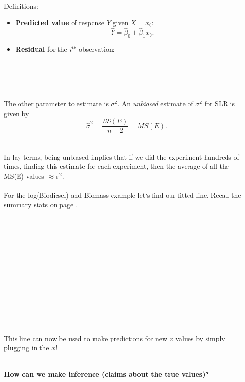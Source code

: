\newpage

Definitions:
\begin{itemize}
\item \textbf{Predicted value} of response $Y$ given $X=x_0$: 
$$ \hat{Y}=\hat\beta_0 + \hat\beta_1 x_0.$$
\item \textbf{Residual} for the $i^{th}$ observation: 
\\~\\~\\~\\~\\
\end{itemize}

The other parameter to estimate is $\sigma^2$.  An {\em unbiased} estimate of $\sigma^2$ for SLR is given by
$$\hat\sigma^2=\frac{SS(E)}{n-2}=MS(E).$$~\\~\\

In lay terms, being unbiased implies that if we did the experiment hundreds of times, finding this estimate for each experiment, then the average of all the MS(E) values $\approx\sigma^2$. \\~\\

For the log(Biodiesel) and Biomass example let`s find our fitted line.  Recall the summary stats on page \pageref{bio}.\\~\\~\\~\\~\\~\\~\\~\\~\\~\\~\\~\\~\\~\\

This line can now be used to make predictions for new $x$ values by simply plugging in the $x$!\\~\\

\newpage

\Large \textbf{How can we make inference (claims about the true values)?}  \large

